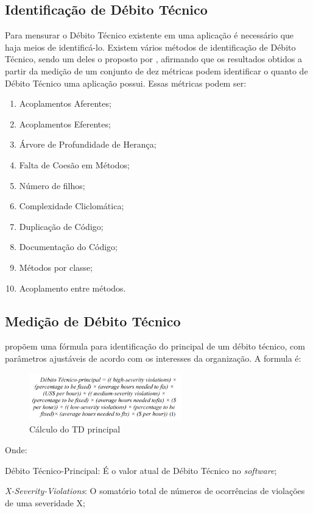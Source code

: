 \subsection{Identificação de Débito Técnico}
Para mensurar o Débito Técnico existente em uma aplicação é necessário que haja
meios de identificá-lo. Existem vários métodos de identificação de Débito Técnico,
sendo um deles o proposto por \cite{siebra}, afirmando que os resultados obtidos a
partir da medição de um conjunto de dez métricas podem identificar o quanto de
Débito Técnico uma aplicação possui. Essas métricas podem ser:

\begin{enumerate}
  \item Acoplamentos Aferentes;
  \item Acoplamentos Eferentes;
  \item Árvore de Profundidade de Herança;
  \item Falta de Coesão em Métodos;
  \item Número de filhos;
  \item Complexidade Cliclomática;
  \item Duplicação de Código;
  \item Documentação do Código;
  \item Métodos por classe;
  \item Acoplamento entre métodos.
\end{enumerate}

\subsection{Medição de Débito Técnico}
\cite{principal} propõem uma fórmula para identificação do principal de um
débito técnico, com parâmetros ajustáveis de acordo com os interesses da
organização. A formula é:

\begin{figure}[h]
  \centering
  \includegraphics[width=250px, scale=1]{figuras/formulaprincipal}
  \caption{Cálculo do TD principal}
\end{figure}
Onde:

Débito Técnico-Principal: É o valor atual de Débito Técnico no \textit{software};

\textit{X-Severity-Violations}: O somatório total de números de ocorrências de violações
de uma severidade X;

